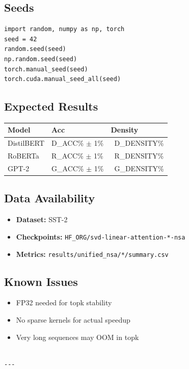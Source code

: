 \subsection{Seeds}

\begin{lstlisting}
import random, numpy as np, torch
seed = 42
random.seed(seed)
np.random.seed(seed)
torch.manual_seed(seed)
torch.cuda.manual_seed_all(seed)
\end{lstlisting}

\subsection{Expected Results}

\begin{table}[H]
\centering
\small
\begin{tabular}{lll}
\toprule
\textbf{Model} & \textbf{Acc} & \textbf{Density} \\
\midrule
DistilBERT & {{D\_ACC}}\% $\pm$ 1\% & ~{{D\_DENSITY}}\% \\
RoBERTa & {{R\_ACC}}\% $\pm$ 1\% & ~{{R\_DENSITY}}\% \\
GPT-2 & {{G\_ACC}}\% $\pm$ 1\% & ~{{G\_DENSITY}}\% \\
\bottomrule
\end{tabular}
\end{table}

\subsection{Data Availability}

\begin{itemize}
\item \textbf{Dataset:} SST-2
\item \textbf{Checkpoints:} \texttt{{{HF\_ORG}}/svd-linear-attention-*-nsa}
\item \textbf{Metrics:} \texttt{results/unified\_nsa/*/summary.csv}

\end{itemize}
\subsection{Known Issues}

\begin{itemize}
\item FP32 needed for topk stability
\item No sparse kernels for actual speedup
\item Very long sequences may OOM in topk
\end{itemize}
\begin{lstlisting}

---
\end{lstlisting}